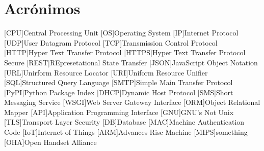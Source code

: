 \chapter*{Acrónimos}
\label{chap:acro}

\begin{acronym}
	[CPU]{Central Processing Unit}
	[OS]{Operating System}
	[IP]{Internet Protocol}
	[UDP]{User Datagram Protocol}
	[TCP]{Transmission Control Protocol}
	[HTTP]{Hyper Text Transfer Protocol}
	[HTTPS]{Hyper Text Transfer Protocol Secure}
	[REST]{REpresetational State Transfer}
	[JSON]{JavaScript Object Notation}
	[URL]{Unirform Resource Locator}
	[URI]{Uniform Resource Unifier}
	[SQL]{Structured Query Language}
	[SMTP]{Simple Main Transfer Protocol}
	[PyPI]{Python Package Index}
	[DHCP]{Dynamic Host Protocol}
	[SMS]{Short Messaging Service}
	[WSGI]{Web Server Gateway Interface}
	[ORM]{Object Relational Mapper}
	[API]{Application Programming Interface}
	[GNU]{GNU's Not Unix}
	[TLS]{Transport Layer Security}
	[DB]{Database}
	[MAC]{Machine Authentication Code}
	[IoT]{Internet of Things}
	[ARM]{Advances Risc Machine}
	[MIPS]{something}
	[OHA]{Open Handset Alliance}
\end{acronym}
